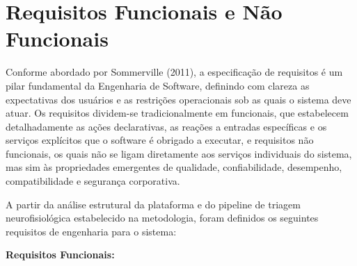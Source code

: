 \section{Requisitos Funcionais e Não Funcionais}
Conforme abordado por Sommerville (2011), a especificação de requisitos é um pilar fundamental da Engenharia de Software, definindo com clareza as expectativas dos usuários e as restrições operacionais sob as quais o sistema deve atuar. Os requisitos dividem-se tradicionalmente em funcionais, que estabelecem detalhadamente as ações declarativas, as reações a entradas específicas e os serviços explícitos que o software é obrigado a executar, e requisitos não funcionais, os quais não se ligam diretamente aos serviços individuais do sistema, mas sim às propriedades emergentes de qualidade, confiabilidade, desempenho, compatibilidade e segurança corporativa.

A partir da análise estrutural da plataforma e do pipeline de triagem neurofisiológica estabelecido na metodologia, foram definidos os seguintes requisitos de engenharia para o sistema:

\textbf{Requisitos Funcionais:}

